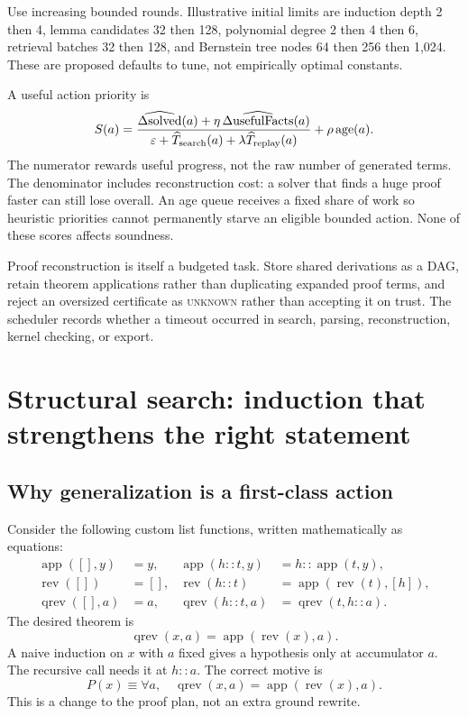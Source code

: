 \documentclass[11pt,letterpaper]{article}
\newcommand{\Unknown}{\textsc{unknown}}
\theoremstyle{definition}\newtheorem{definition}[theorem]{Definition}
\theoremstyle{remark}\newtheorem{remark}[theorem]{Remark}
\begin{document}
Use increasing bounded rounds. Illustrative initial limits are induction depth 2 then 4, lemma candidates 32 then 128, polynomial degree 2 then 4 then 6, retrieval batches 32 then 128, and Bernstein tree nodes 64 then 256 then 1,024. These are proposed defaults to tune, not empirically optimal constants.

A useful action priority is
\[
 S(a)=\frac{\widehat{\Delta\mathrm{solved}}(a)+\eta\,\widehat{\Delta\mathrm{usefulFacts}}(a)}
 {\varepsilon+\widehat{T}_{\rm search}(a)+\lambda\widehat{T}_{\rm replay}(a)}
 +\rho\,\mathrm{age}(a).
\]
The numerator rewards useful progress, not the raw number of generated terms. The denominator includes reconstruction cost: a solver that finds a huge proof faster can still lose overall. An age queue receives a fixed share of work so heuristic priorities cannot permanently starve an eligible bounded action. None of these scores affects soundness.

Proof reconstruction is itself a budgeted task. Store shared derivations as a DAG, retain theorem applications rather than duplicating expanded proof terms, and reject an oversized certificate as \Unknown{} rather than accepting it on trust. The scheduler records whether a timeout occurred in search, parsing, reconstruction, kernel checking, or export.

\section{Structural search: induction that strengthens the right statement}
\subsection{Why generalization is a first-class action}
Consider the following custom list functions, written mathematically as equations:
\begin{align*}
\operatorname{app}([],y)&=y,&
\operatorname{app}(h::t,y)&=h::\operatorname{app}(t,y),\\
\operatorname{rev}([])&=[],&
\operatorname{rev}(h::t)&=\operatorname{app}(\operatorname{rev}(t),[h]),\\
\operatorname{qrev}([],a)&=a,&
\operatorname{qrev}(h::t,a)&=\operatorname{qrev}(t,h::a).
\end{align*}
The desired theorem is
\begin{equation}\label{eq:qrev}
\operatorname{qrev}(x,a)=\operatorname{app}(\operatorname{rev}(x),a).
\end{equation}
A naive induction on $x$ with $a$ fixed gives a hypothesis only at accumulator $a$. The recursive call needs it at $h::a$. The correct motive is
\[
 P(x)\equiv\forall a,\quad
 \operatorname{qrev}(x,a)=\operatorname{app}(\operatorname{rev}(x),a).
\]
This is a change to the proof plan, not an extra ground rewrite.
\end{document}
